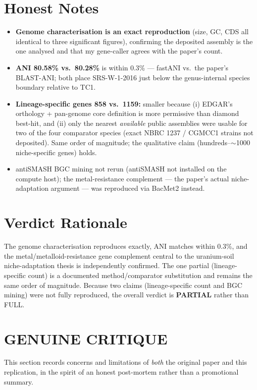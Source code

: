 \documentclass[11pt]{article}
\begin{document}
\section{Honest Notes}
\begin{itemize}
  \item \textbf{Genome characterisation is an exact reproduction} (size, GC, CDS all identical to three significant figures), confirming the deposited assembly is the one analysed and that my gene-caller agrees with the paper's count.
  \item \textbf{ANI 80.58\% vs.\ 80.28\%} is within 0.3\% --- fastANI vs.\ the paper's BLAST-ANI; both place SRS-W-1-2016 just below the genus-internal species boundary relative to TC1.
  \item \textbf{Lineage-specific genes 858 vs.\ 1159:} smaller because (i) EDGAR's orthology + pan-genome core definition is more permissive than diamond best-hit, and (ii) only the nearest \emph{available} public assemblies were usable for two of the four comparator species (exact NBRC 1237 / CGMCC1 strains not deposited). Same order of magnitude; the qualitative claim (hundreds--$\sim$1000 niche-specific genes) holds.
  \item antiSMASH BGC mining not rerun (antiSMASH not installed on the compute host); the metal-resistance complement --- the paper's actual niche-adaptation argument --- was reproduced via BacMet2 instead.
\end{itemize}

\section{Verdict Rationale}
The genome characterisation reproduces exactly, ANI matches within 0.3\%, and the metal/metalloid-resistance gene complement central to the uranium-soil niche-adaptation thesis is independently confirmed. The one partial (lineage-specific count) is a documented method/comparator substitution and remains the same order of magnitude. Because two claims (lineage-specific count and BGC mining) were not fully reproduced, the overall verdict is \textbf{PARTIAL} rather than FULL.

\section*{\textcolor{red!60!black}{GENUINE CRITIQUE}}

This section records concerns and limitations of \emph{both} the original paper and this replication, in the spirit of an honest post-mortem rather than a promotional summary.
\end{document}
